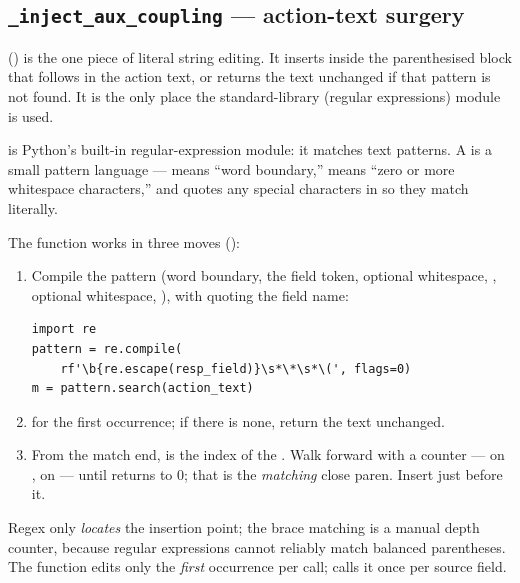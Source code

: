 \subsection{\texttt{\_inject\_aux\_coupling} --- action-text surgery}
\label{sec:cm-injectcoupling}

() is the one piece of literal
string editing. It inserts  inside the parenthesised block that
follows  in the action text, or returns the text unchanged
if that pattern is not found. It is the only place the standard-library
 (regular expressions) module is used.

\begin{defn}
 is Python's built-in regular-expression module: it matches text
patterns. A  is a small pattern language --- 
means ``word boundary,''  means ``zero or more whitespace characters,''
and  quotes any special characters in  so they match
literally.
\end{defn}

The function works in three moves
():
\begin{enumerate}
  \item Compile the pattern (word boundary, the field token, optional whitespace,
        \code{*}, optional whitespace, \code{(}), with  quoting the
        field name:
\begin{lstlisting}
import re
pattern = re.compile(
    rf'\b{re.escape(resp_field)}\s*\*\s*\(', flags=0)
m = pattern.search(action_text)
\end{lstlisting}
  \item {} for the first occurrence; if there is none, return the
        text unchanged.
  \item From the match end,  is the index of the
        \code{(}. Walk forward with a  counter ---  on
        \code{(},  on \code{)} --- until  returns to $0$; that
        is the \emph{matching} close paren. Insert 
        just before it.
\end{enumerate}
Regex only \emph{locates} the insertion point; the brace matching is a manual
depth counter, because regular expressions cannot reliably match balanced
parentheses. The function edits only the \emph{first} 
occurrence per call;  calls it once per source field.

